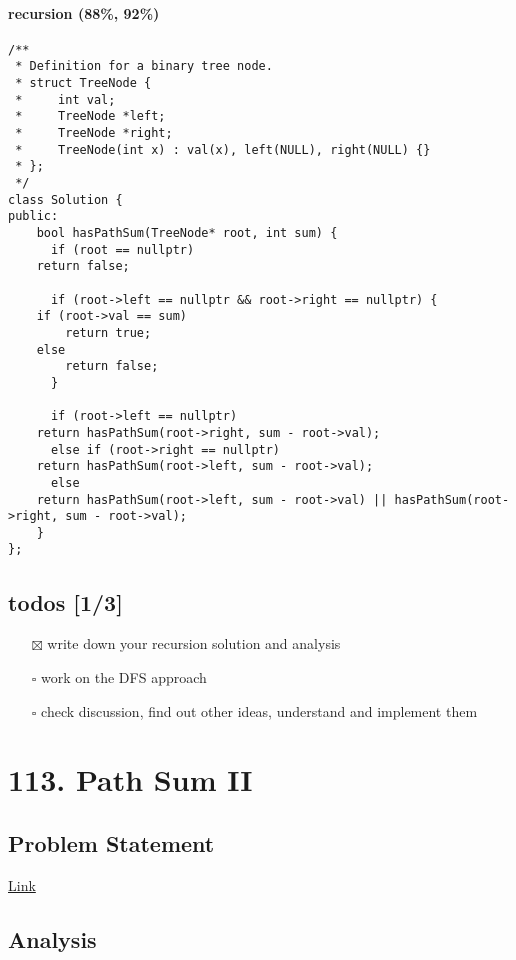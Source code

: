 \documentclass[12pt]{book}
\begin{document}
\subsubsection{recursion (88\%, 92\%)}
\label{sec:org131ca7c}
\begin{verbatim}
/**
 * Definition for a binary tree node.
 * struct TreeNode {
 *     int val;
 *     TreeNode *left;
 *     TreeNode *right;
 *     TreeNode(int x) : val(x), left(NULL), right(NULL) {}
 * };
 */
class Solution {
public:
    bool hasPathSum(TreeNode* root, int sum) {
      if (root == nullptr)
	return false;

      if (root->left == nullptr && root->right == nullptr) {
	if (root->val == sum)
	    return true;
	else
	    return false;
      }

      if (root->left == nullptr)
	return hasPathSum(root->right, sum - root->val);
      else if (root->right == nullptr)
	return hasPathSum(root->left, sum - root->val);
      else
	return hasPathSum(root->left, sum - root->val) || hasPathSum(root->right, sum - root->val);
    }
};
\end{verbatim}
\section{todos [1/3]}
\label{sec:orgb950350}
\begin{itemize}
\item[{$\boxtimes$}] write down your recursion solution and analysis
\item[{$\square$}] work on the DFS approach
\item[{$\square$}] check discussion, find out other ideas, understand and implement them
\end{itemize}

\chapter{113. Path Sum II}
\label{sec:org03ee144}
\section{Problem Statement}
\label{sec:org9284390}
\href{https://leetcode.com/problems/path-sum-ii/}{Link}
\section{Analysis}
\label{sec:orgfebd182}
\end{document}

